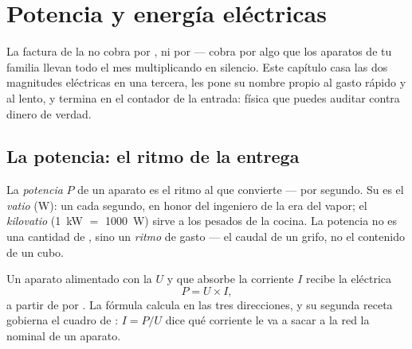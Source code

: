\chapter{Potencia y energía eléctricas}\label{ch:g9:electric-power-energy}

La factura de la  no cobra por , ni por
 --- cobra por algo que los aparatos de tu familia llevan
todo el mes multiplicando en silencio. Este capítulo casa las dos
magnitudes eléctricas en una tercera, les pone su nombre propio al
gasto rápido y al lento, y termina en el contador de la entrada: física
que puedes auditar contra dinero de verdad.

\section{La potencia: el ritmo de la entrega}

\begin{definition}\label{def:g9:electric-power-energy:power}
La \emph{potencia} $P$ de un aparato es el ritmo al que
convierte  ---  por segundo. Su
 es el \emph{vatio} (\unit{W}): un
 cada segundo, en honor del ingeniero de la era del vapor;
el \emph{kilovatio} (\qty{1}{kW} $=$ \qty{1000}{W}) sirve a los 
pesados de la cocina. La potencia no es una cantidad de
, sino un \emph{ritmo} de gasto --- el caudal de un grifo,
no el contenido de un cubo.
\end{definition}

\begin{proposition}\label{prop:g9:electric-power-energy:UI}
Un aparato alimentado con la  $U$ y que absorbe la
corriente $I$ recibe la  eléctrica
\[
P = U \times I ,
\]
 a partir de  por . La
fórmula calcula en las tres direcciones, y su segunda receta gobierna
el cuadro de : $I = P/U$ dice qué corriente le va a
sacar a la red la  nominal de un aparato.
\end{proposition}

